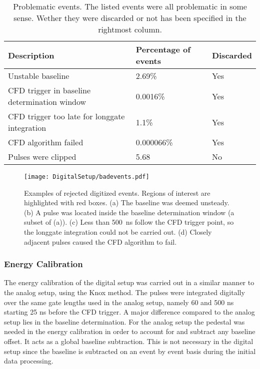 \documentclass[main.tex]{subfiles}
\begin{document}
\begin{table}[]
\begin{tabular}{|l|l|l|}
\hline
\textbf{Description}                          & \textbf{Percentage of events} & \textbf{Discarded} \\ \hline
Unstable baseline                             & 2.69\%                        & Yes                \\ \hline
CFD trigger in baseline determination window  & 0.0016\%                      & Yes                \\ \hline
CFD trigger too late for longgate integration & 1.1\%                         & Yes                \\ \hline
CFD algorithm failed                          & 0.000066\%                    & Yes                \\ \hline
Pulses were clipped                           & 5.68                          & No                 \\ \hline
\end{tabular}
\caption[Problematic events.]{Problematic events. The listed events were all problematic in some sense. Wether they were discarded or not has been specified in the rightmost column.}
\end{table}

\begin{figure}[ht!]
    \centering
        \texttt{[image: DigitalSetup/badevents.pdf]}
        \caption[Examples of rejected digitized events]{Examples of rejected digitized events. Regions of interest are highlighted with red boxes. (a) The baseline was deemed unsteady. (b) A pulse was located inside the baseline determination window (a subset of (a)). (c) Less than \SI{500}{ns} follow the CFD trigger point, so the longgate integration could not be carried out. (d) Closely adjacent pulses caused the CFD algorithm to fail.}
    \label{fig:badevents} 
\end{figure}
\newpage
\subsubsection{Energy Calibration}
The energy calibration of the digital setup was carried out in a similar manner to the analog setup, using the Knox method. The pulses were integrated digitally over the same gate lengths used in the analog setup, namely 60 and 500 ns starting 25 ns before the CFD trigger. A major difference compared to the analog setup lies in the baseline determination. For the analog setup the pedestal was needed in the energy calibration in order to account for and subtract any baseline offset. It acts as a global baseline subtraction. This is not necessary in the digital setup since the baseline is subtracted on an event by event basis during the initial data processing. 
\end{document}
